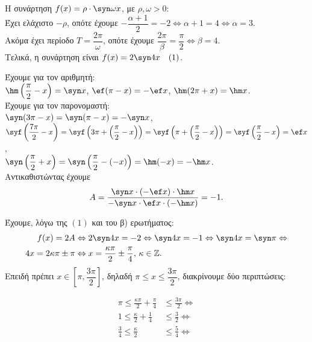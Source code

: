 \begin{alist}
\item Η συνάρτηση $f(x) = \rho \cdot \syn \omega x$, με $\rho, \omega > 0$: \\
Έχει ελάχιστο $-\rho$, οπότε έχουμε $-\dfrac{\alpha+1}{2} = -2 \Leftrightarrow \alpha + 1 = 4 \Leftrightarrow \alpha = 3$. \\
Ακόμα έχει περίοδο $T = \dfrac{2\pi}{\omega}$, οπότε έχουμε $\dfrac{2\pi}{\beta} = \dfrac{\pi}{2} \Leftrightarrow \beta = 4$. \\
Τελικά, η συνάρτηση είναι $f(x) = 2\syn  4x \quad(1)$.
\item Έχουμε για τον αριθμητή: \\
$\hm \left(\dfrac{\pi}{2} - x\right) = \syn  x$, $\ef (\pi - x) = -\ef  x$, $\hm (2\pi + x) = \hm  x$. \\
Έχουμε για τον παρονομαστή: \\
$\syn (3\pi - x) = \syn (\pi - x) = -\syn  x$, \\
$\syf \left(\dfrac{7\pi}{2} - x\right) = \syf \left(3\pi + \left(\dfrac{\pi}{2} - x\right)\right) = \syf \left(\pi + \left(\dfrac{\pi}{2} - x\right)\right) = \syf \left(\dfrac{\pi}{2} - x\right) = \ef  x$, \\
$\syn \left(\dfrac{\pi}{2} + x\right) = \syn \left(\dfrac{\pi}{2} - (-x)\right) = \hm (-x) = -\hm  x$. \\
Αντικαθιστώντας έχουμε 
\[A = \frac{\syn  x \cdot (-\ef  x) \cdot \hm  x}{-\syn  x \cdot \ef  x \cdot (-\hm  x)} = -1.\]
\item Έχουμε, λόγω της $(1)$ και του β) ερωτήματος:
\begin{align*}
f(x) = 2A &\Leftrightarrow 2\syn  4x = -2 \Leftrightarrow \syn  4x = -1 \Leftrightarrow \syn  4x = \syn \pi \Leftrightarrow \\
4x = 2\kappa\pi \pm \pi &\Leftrightarrow x = \frac{\kappa\pi}{2} \pm \frac{\pi}{4}, \, \kappa \in \mathbb{Z}.
\end{align*}
Επειδή πρέπει $x \in \left[\pi, \dfrac{3\pi}{2}\right]$, δηλαδή $\pi \le x \le \dfrac{3\pi}{2}$, διακρίνουμε δύο περιπτώσεις:
\begin{center}
\begin{minipage}[t]{0.45\textwidth}
\begin{align*}
\pi \le \frac{\kappa\pi}{2} + \frac{\pi}{4} &\le \frac{3\pi}{2} \Leftrightarrow \\
1 \le \frac{\kappa}{2} + \frac{1}{4} &\le \frac{3}{2} \Leftrightarrow \\
\frac{3}{4} \le \frac{\kappa}{2} &\le \frac{5}{4} \Leftrightarrow \\

\end{align*}
\end{minipage}
\end{center}
\end{alist}
